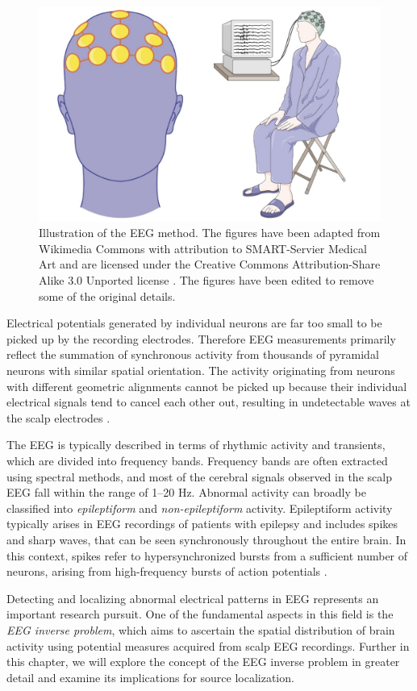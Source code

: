 \documentclass[a4paper, UKenglish, 11pt]{uiomaster}
\begin{document}
\begin{figure}[!htb]
    \centering
    \includegraphics[width=0.6\linewidth]{figures/new_eeg_wiki.jpg}
    \caption{Illustration of the EEG method. The figures have been adapted from Wikimedia Commons with attribution to SMART-Servier Medical Art and are licensed under the Creative Commons Attribution-Share Alike 3.0 Unported license \cite{EEG_head} \cite{EEG_full_body}. The figures have been edited to remove some of the original details.}
    \label{fig:EEG}
\end{figure}


Electrical potentials generated by individual neurons are far too small to be picked up by the recording electrodes. Therefore EEG measurements primarily reflect the summation of synchronous activity from thousands of pyramidal neurons with similar spatial orientation. The activity originating from neurons with different geometric alignments cannot be picked up because their individual electrical signals tend to cancel each other out, resulting in undetectable waves at the scalp electrodes \cite{bromfield2006introduction}.

The EEG is typically described in terms of rhythmic activity and transients, which are divided into frequency bands. Frequency bands are often extracted using spectral methods, and most of the cerebral signals observed in the scalp EEG fall within the range of 1–20 Hz. Abnormal activity can broadly be classified into \emph{epileptiform} and \emph{non-epileptiform} activity. Epileptiform activity typically arises in EEG recordings of patients with epilepsy and includes spikes and sharp waves, that can be seen synchronously throughout the entire brain. In this context, spikes refer to hypersynchronized bursts from a sufficient number of neurons, arising from high-frequency bursts of action potentials \cite{bromfield2006introduction}.

Detecting and localizing abnormal electrical patterns in EEG represents an important research pursuit. One of the fundamental aspects in this field is the \emph{EEG inverse problem}, which aims to ascertain the spatial distribution of brain activity using potential measures acquired from scalp EEG recordings. Further in this chapter, we will explore the concept of the EEG inverse problem in greater detail and examine its implications for source localization.
\end{document}
